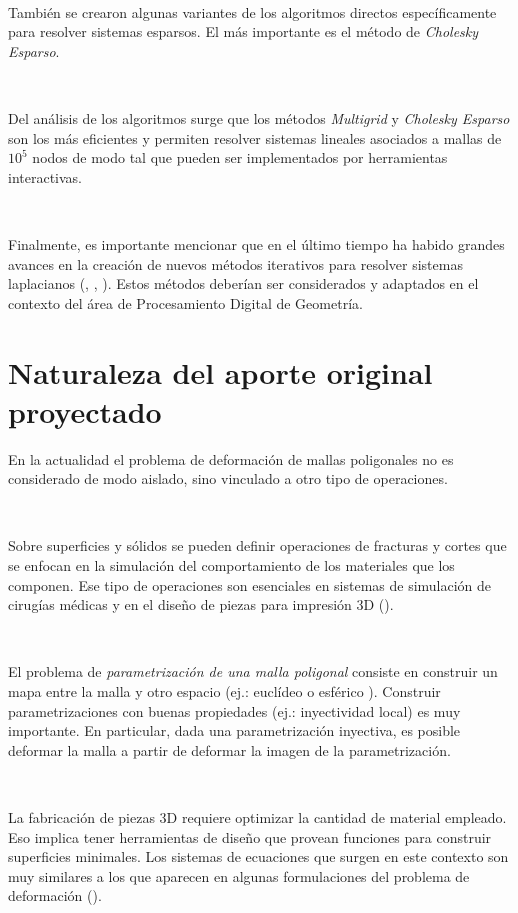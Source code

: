 \documentclass{article}
\begin{document}
\

También se crearon algunas variantes de los algoritmos directos específicamente 
para resolver sistemas esparsos. El más importante es el método de 
\emph{Cholesky Esparso}.

\

Del análisis de los algoritmos \cite{K:2005} surge que los métodos 
\emph{Multigrid} y \emph{Cholesky Esparso} son los más eficientes y 
permiten resolver sistemas lineales asociados a mallas de $10^5$ nodos 
de modo tal que pueden ser implementados por herramientas interactivas.

\

Finalmente, es importante mencionar que en el último tiempo ha
habido grandes avances en la creación de nuevos métodos
iterativos para resolver sistemas laplacianos (\cite{S:2010}, \cite{T:2010}, 
\cite{K:2010}). Estos métodos deberían ser considerados y adaptados en el 
contexto del área de Procesamiento Digital de Geometría.

\section{Naturaleza del aporte original proyectado}

En la actualidad el problema de deformación de mallas poligonales no es 
considerado de modo aislado, sino vinculado a otro tipo de operaciones. 

\

Sobre superficies y sólidos se pueden definir operaciones  
de fracturas y cortes que se enfocan en la simulación del comportamiento 
de los materiales que los componen. Ese tipo de operaciones son esenciales 
en sistemas de simulación de cirugías médicas y en el diseño de piezas para 
impresión 3D (\cite{KBT:2017}).

\

El problema de \emph{parametrización de una malla poligonal} consiste 
en construir un mapa entre la malla y otro espacio (ej.: euclídeo \cite{RPPS:2017} 
o esférico \cite{AKL:2017}). Construir parametrizaciones con buenas propiedades (ej.: 
inyectividad local) es muy importante. En particular, dada una 
parametrización inyectiva, es posible deformar la malla a partir de 
deformar la imagen de la parametrización. 

\

La fabricación de piezas 3D requiere optimizar la cantidad de material 
empleado. Eso implica tener herramientas de diseño que provean funciones 
para construir superficies minimales. Los sistemas de ecuaciones que surgen 
en este contexto son muy similares a los que aparecen en algunas formulaciones 
del problema de deformación (\cite{POT:2017}). 
\end{document}

